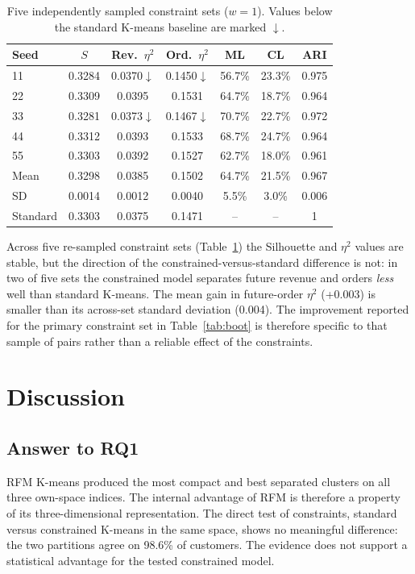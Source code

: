 \documentclass[conference,10pt]{IEEEtran}
\newcommand{\etasq}{\eta^{2}}
\begin{document}
\begin{table}[t]
\centering
\caption{Five independently sampled constraint sets ($w=1$). Values below
the standard K-means baseline are marked $\downarrow$.}
\label{tab:robust}
\footnotesize
\setlength{\tabcolsep}{3pt}
\begin{tabular}{lcccccc}
\toprule
\textbf{Seed} & \textbf{$S$} & \textbf{Rev.\ $\etasq$} & \textbf{Ord.\ $\etasq$} & \textbf{ML} & \textbf{CL} & \textbf{ARI}\\
\midrule
11 & 0.3284 & 0.0370$\downarrow$ & 0.1450$\downarrow$ & 56.7\% & 23.3\% & 0.975\\
22 & 0.3309 & 0.0395 & 0.1531 & 64.7\% & 18.7\% & 0.964\\
33 & 0.3281 & 0.0373$\downarrow$ & 0.1467$\downarrow$ & 70.7\% & 22.7\% & 0.972\\
44 & 0.3312 & 0.0393 & 0.1533 & 68.7\% & 24.7\% & 0.964\\
55 & 0.3303 & 0.0392 & 0.1527 & 62.7\% & 18.0\% & 0.961\\
\midrule
Mean & 0.3298 & 0.0385 & 0.1502 & 64.7\% & 21.5\% & 0.967\\
SD   & 0.0014 & 0.0012 & 0.0040 & 5.5\% & 3.0\% & 0.006\\
\midrule
Standard & 0.3303 & 0.0375 & 0.1471 & -- & -- & 1\\
\bottomrule
\end{tabular}
\end{table}

Across five re-sampled constraint sets (Table~\ref{tab:robust}) the
Silhouette and $\etasq$ values are stable, but the direction of the
constrained-versus-standard difference is not: in two of five sets the
constrained model separates future revenue and orders \emph{less} well than
standard K-means. The mean gain in future-order $\etasq$ (+0.003) is smaller
than its across-set standard deviation (0.004). The improvement reported for
the primary constraint set in Table~\ref{tab:boot} is therefore specific to
that sample of pairs rather than a reliable effect of the constraints.

\section{Discussion}
\label{sec:discussion}

\subsection{Answer to RQ1}
RFM K-means produced the most compact and best separated clusters on all
three own-space indices. The internal advantage of RFM is
therefore a property of its three-dimensional representation. The direct test of constraints, standard
versus constrained K-means in the same space, shows no meaningful difference:
the two partitions agree on 98.6\% of customers. The evidence does not
support a statistical advantage for the tested constrained model.
\end{document}
